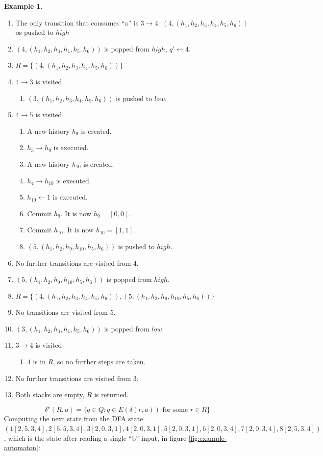 \documentclass[english]{sigplanconf}
\theoremstyle{definition}
\newtheorem{example}{Example}[section]
\begin{document}
\begin{example}
\begin{enumerate}
\item The only transition that consumes ``a'' is $3\rightarrow 4$. $(4, (h_1, h_2, h_3, h_4, h_5, h_6))$ os pushed to $high$
\item $(4, (h_1, h_2, h_3, h_4, h_5, h_6))$ is popped from $high$, $q'\leftarrow 4$.
\item $R=\{(4, (h_1, h_2, h_3, h_4, h_5, h_6))\}$
\item $4\rightarrow 3$ is visited. \begin{enumerate}
	\item $(3, (h_1, h_2, h_3, h_4, h_5, h_6))$ is pushed to $low$.
\end{enumerate}
\item $4\rightarrow 5$ is visited. \begin{enumerate}
	\item A new history $h_9$ is created.
	\item $h_3\rightarrow h_9$ is executed.
	\item A new history $h_{10}$ is created.
	\item $h_4\rightarrow h_{10}$ is executed.
	\item $h_{10} \leftarrow 1$ is executed.
	\item Commit $h_9$. It is now $h_9=[0,0]$.
	\item Commit $h_{10}$. It is now $h_{10}=[1,1]$.
	\item $(5, (h_1, h_2, h_9, h_{10}, h_5, h_6))$ is pushed to $high$.
\end{enumerate}
\item No further transitions are visited from $4$.
\item $(5, (h_1, h_2, h_9, h_{10}, h_5, h_6))$ is popped from $high$.
\item $R=\{(4, (h_1, h_2, h_3, h_4, h_5, h_6)), (5, (h_1, h_2, h_9, h_{10}, h_5, h_6))\}$
\item No transitions are visited from $5$.
\item $(3, (h_1, h_2, h_3, h_4, h_5, h_6))$ is popped from $low$.
\item $3\rightarrow 4$ is visited \begin{enumerate}
	\item $4$ is in $R$, so no further steps are taken.
\end{enumerate}
\item No further transitions are visited from $3$.
\item Both stacks are empty, $R$ is returned.
\end{enumerate}
\end{example}
\[
\delta^{\star}(R,a)=\{q\in Q:q\in E(\delta(r,a))\text{ for some }r\in R\}
\]
Computing the next state from the DFA state $(1[2,5,3,4],2[6,5,3,4],3[2,0,3,1],4[2,0,3,1],5[2,0,3,1],6[2,0,3,4],7[2,0,3,4],8[2,5,3,4])$,
which is the state after reading a single ``b'' input, in figure
\ref{fig:example-automaton}: 
\end{document}
